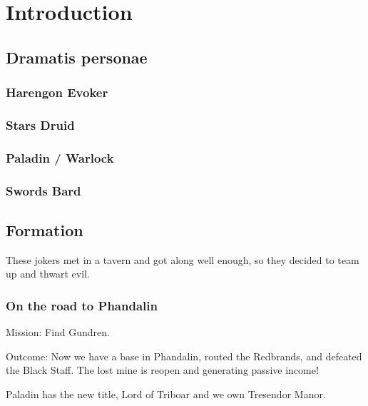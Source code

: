 \documentclass[10pt,a4paper,twoside,fancy,twocolumn,openany,nodeprecatedcode]{dndbook}
\begin{document}
\frontmatter
\rpgMakeCover[
    image = images/adventure/VNotEE/000-00-001.something-wicked-approaches.png,
    title = Defenders of the Dawn,
    subtitle = Chronicles of an adventuring team and their tussle with Vecna.,
]

\mainmatter
\chapter{Introduction}

\section{Dramatis personae}

\subsection{Harengon Evoker}

\subsection{Stars Druid}

\subsection{Paladin / Warlock}

\subsection{Swords Bard}

\section{Formation}

These jokers met in a tavern and got along well enough, so they decided to team up and thwart evil.

\subsection{On the road to Phandalin}

Mission: Find Gundren. 

Outcome: Now we have a base in Phandalin, routed the Redbrands, and defeated the Black Staff. The lost mine is reopen and generating passive income!

Paladin has the new title, Lord of Triboar and we own Tresendor Manor.
\end{document}
